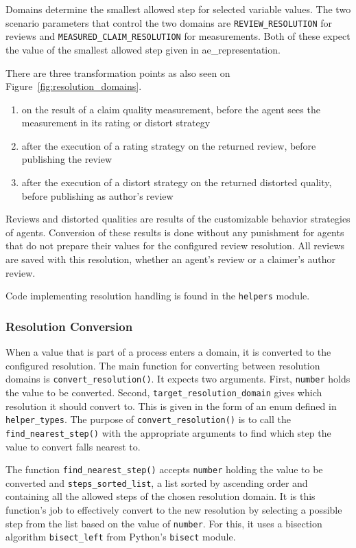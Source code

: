 \documentclass[%
    ]{\PathToTumTemplate/thesis/tum_thesis}
\begin{document}
Domains determine the smallest allowed step for selected variable values.
The two scenario parameters that control the two domains are \texttt{REVIEW\_RESOLUTION} for reviews and \texttt{MEASURED\_CLAIM\_RESOLUTION} for measurements.
Both of these expect the value of the smallest allowed step given in \gls{ae_representation}.

There are three transformation points as also seen on Figure~\ref{fig:resolution_domains}.
\begin{enumerate}
    \item on the result of a claim quality measurement, before the agent sees the measurement in its rating or distort strategy
    \item after the execution of a rating strategy on the returned review, before publishing the review
    \item after the execution of a distort strategy on the returned distorted quality, before publishing as author's review
\end{enumerate}

Reviews and distorted qualities are results of the customizable behavior strategies of agents. 
Conversion of these results is done without any punishment for agents that do not prepare their values for the configured review resolution.
All reviews are saved with this resolution, whether an agent's review or a claimer's author review.

Code implementing resolution handling is found in the \texttt{helpers} module.

\subsubsection{Resolution Conversion}

When a value that is part of a process enters a domain, it is converted to the configured resolution.
The main function for converting between resolution domains is \lstinline{convert_resolution()}.
It expects two arguments.
First, \texttt{number} holds the value to be converted.
Second, \texttt{target\_resolution\_domain} gives which resolution it should convert to.
This is given in the form of an enum defined in \texttt{helper\_types}.
The purpose of \lstinline{convert_resolution()} is to call the \lstinline{find_nearest_step()} with the appropriate arguments to find which step the value to convert falls nearest to.

The function \lstinline{find_nearest_step()} accepts \texttt{number} holding the value to be converted and \texttt{steps\_sorted\_list}, a list sorted by ascending order and containing all the allowed steps of the chosen resolution domain.
It is this function's job to effectively convert to the new resolution by selecting a possible step from the list based on the value of \texttt{number}.
For this, it uses a bisection algorithm \lstinline{bisect_left} from Python's \texttt{bisect} module.
\end{document}
